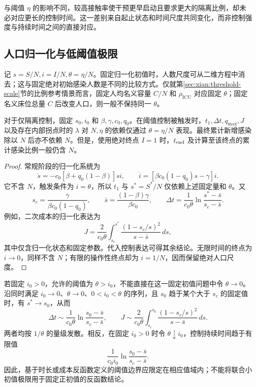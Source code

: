 \documentclass[lang=cn,a4paper,newtx]{elegantpaper}
\numberwithin{equation}{section}
\theoremstyle{plain}
\begin{document}
与阈值 $\eta$ 的影响不同，较高接触率使干预更早启动且要求更大的隔离比例，却未必对应更长的控制时间。这一差别来自起止状态和时间尺度共同变化，而非控制强度与持续时间之间的直接对应。

\subsection{人口归一化与低阈值极限}
\label{sec:scaling-theory}
记 $s=S/N,i=I/N,\theta=\eta/N$。固定归一化初值时，人数尺度可从二维方程中消去；这与固定绝对初始感染人数是不同的比较方式。仅就第\ref{sec:xian:threshold-scale}节的比例参考情景而言，固定人均名义容量 $C/N$ 和 $\rho_{\mathrm{ICU}}$ 对应固定 $\theta$；固定名义床位总量 $C$ 后改变人口，则一般不保持同一 $\theta$。
\begin{proposition}
\label{prop:scaling}
对于仅隔离控制，固定 $s_0,i_0$ 和 $\beta,\gamma,c_0,q_0$。在阈值控制被触发时，$t_1,\Delta t,q_{\max},J$ 以及存在内部拐点时的 $\lambda$ 对 $N,\eta$ 的依赖仅通过 $\theta=\eta/N$ 表现。最终累计新增感染除以 $N$ 后亦不依赖 $N$。但是，使用绝对终点 $I=1$ 时，$t_{\rm end}$ 及计算至该终点的累计感染比例一般仍含 $N$。
\end{proposition}
\begin{proof}
常规阶段的归一化系统为
\[
\dot s=-c_0[\beta+q_0(1-\beta)]si,\qquad
\dot i=[\beta c_0(1-q_0)s-\gamma]i.
\]
它不含 $N$，触发条件为 $i=\theta$，所以 $t_1$ 与 $s^*=S^*/N$ 仅依赖上述固定量和 $\theta$。又
\[
s_c=\frac{\gamma}{\beta c_0(1-q_0)},\qquad
\bar s=\frac{(1-\beta)\gamma}{\beta c_0},\qquad
\Delta t=\frac1{c_0\theta}\ln\frac{s^*-\bar s}{s_c-\bar s}.
\]
例如，二次成本的归一化表达为
\begin{equation}
J=\frac{2}{c_0\theta}\int_{s_c}^{s^*}
\frac{(1-s_c/s)^2}{s-\bar s}\,ds,
\label{eq:dom:Jtheta}
\end{equation}
其中仅含归一化状态和固定参数。代入控制表达可得其余结论。无限时间的终点为 $i\to0$，同样不含 $N$；有限的操作性终点却为 $i=1/N$，因而保留绝对人口尺度。
\end{proof}

若固定 $i_0>0$，允许的阈值为 $\theta>i_0$，不能直接在这一固定初值问题中令 $\theta\to0$。沿同时满足 $i_0\to0$、$\theta\to0$、$0<i_0<\theta$ 的序列，且 $s_0$ 趋于某个大于 $s_c$ 的固定值时，有 $s^*\to s_0$，从而
\begin{equation}
\Delta t\sim\frac1{c_0\theta}\ln\frac{s_0-\bar s}{s_c-\bar s},\qquad
J\sim\frac2{c_0\theta}\int_{s_c}^{s_0}\frac{(1-s_c/s)^2}{s-\bar s}\,ds.
\label{eq:small-threshold}
\end{equation}
两者均按 $1/\theta$ 的量级发散。相反，在固定 $i_0>0$ 时令 $\theta\downarrow i_0$，控制持续时间趋于有限值
\[
\frac1{c_0i_0}\ln\frac{s_0-\bar s}{s_c-\bar s}.
\]
因此，基于时长或成本反函数定义的阈值边界应限定在相应值域内；不能将联合小初值极限用于固定正初值的反函数结论。
\end{document}
